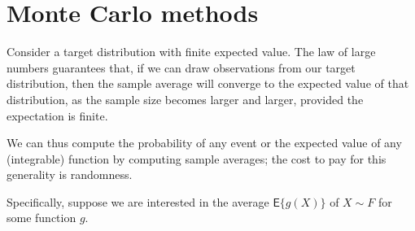 \documentclass[
  11pt,
  letterpaper,
]{scrbook}
\theoremstyle{definition}
\theoremstyle{plain}
\theoremstyle{plain}
\theoremstyle{definition}
\theoremstyle{definition}
\theoremstyle{remark}
\begin{document}
\section{Monte Carlo methods}\label{monte-carlo-methods}

Consider a target distribution with finite expected value. The law of
large numbers guarantees that, if we can draw observations from our
target distribution, then the sample average will converge to the
expected value of that distribution, as the sample size becomes larger
and larger, provided the expectation is finite.

We can thus compute the probability of any event or the expected value
of any (integrable) function by computing sample averages; the cost to
pay for this generality is randomness.

Specifically, suppose we are interested in the average
\(\mathsf{E}\{g(X)\}\) of \(X \sim F\) for some function \(g\).
\end{document}
